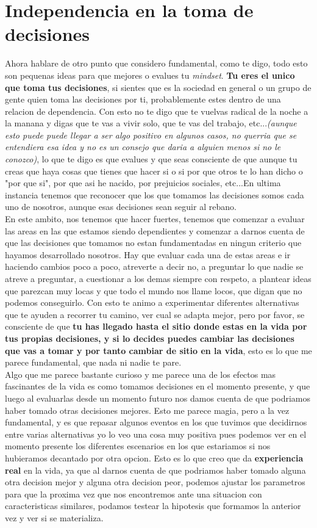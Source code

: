 \section{Independencia en la toma de decisiones}
Ahora hablare de otro punto que considero fundamental, como te digo, todo esto son pequenas ideas para que mejores o evalues tu \textit{mindset}. \textbf{Tu eres el unico que toma tus decisiones}, si sientes que es la sociedad en general o un grupo de gente quien toma las decisiones por ti, probablemente estes dentro de una relacion de dependencia. Con esto no te digo que te vuelvas radical de la noche a la manana y digas que te vas a vivir solo, que te vas del trabajo, etc...\textit{(aunque esto puede puede llegar a ser algo positivo en algunos casos, no querria que se entendiera esa idea y no es un consejo que daria a alguien menos si no le conozco)}, lo que te digo es que evalues y que seas consciente de que aunque tu creas que haya cosas que tienes que hacer si o si por que otros te lo han dicho o "por que si", por que asi he nacido, por prejuicios sociales, etc...En ultima instancia tenemos que reconocer que los que tomamos las decisiones somos cada uno de nosotros, aunque esas decisiones sean seguir al rebano. \\

En este ambito, nos tenemos que hacer fuertes, tenemos que comenzar a evaluar las areas en las que estamos siendo dependientes y comenzar a darnos cuenta de que las decisiones que tomamos no estan fundamentadas en ningun criterio que hayamos desarrollado nosotros. Hay que evaluar cada una de estas areas e ir haciendo cambios poco a poco, atreverte a decir no, a preguntar lo que nadie se atreve a preguntar, a cuestionar a los demas siempre con respeto, a plantear ideas que parezcan muy locas y que todo el mundo nos llame locos, que digan que no podemos conseguirlo. Con esto te animo a experimentar diferentes alternativas que te ayuden a recorrer tu camino, ver cual se adapta mejor, pero por favor, se consciente de que \textbf{tu has llegado hasta el sitio donde estas en la vida por tus propias decisiones, y si lo decides puedes cambiar las decisiones que vas a tomar y por tanto cambiar de sitio en la vida}, esto es lo que me parece fundamental, que nada ni nadie te pare.\\

Algo que me parece bastante curioso y me parece una de los efectos mas fascinantes de la vida es como tomamos decisiones en el momento presente, y que luego al evaluarlas desde un momento futuro nos damos cuenta de que podriamos haber tomado otras decisiones mejores. Esto me parece magia, pero a la vez fundamental, y es que repasar algunos eventos en los que tuvimos que decidirnos entre varias alternativas yo lo veo una cosa muy positiva pues podemos ver en el momento presente los diferentes escenarios en los que estariamos si nos hubieramos decantado por otra opcion. Esto es lo que creo que da \textbf{experiencia real} en la vida, ya que al darnos cuenta de que podriamos haber tomado alguna otra decision mejor y alguna otra decision peor, podemos ajustar los parametros para que la proxima vez que nos encontremos ante una situacion con caracteristicas similares, podamos testear la hipotesis que formamos la anterior vez y ver si se materializa.\\
